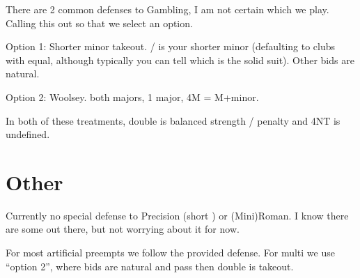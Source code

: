\documentclass[tom-ari]{subfile}
\begin{document}
	There are 2 common defenses to Gambling, I am not certain which we play. Calling this out so that we select an option.
	
	Option 1:  Shorter minor takeout. / is your shorter minor (defaulting to clubs with equal, although typically you can tell which is the solid suit). Other bids are natural.
	
	Option 2:  Woolsey.  both majors,  1 major, 4M = M+minor.
	
	In both of these treatments, double is balanced strength / penalty and 4NT is undefined.
	
	\section{Other}
	
	Currently no special defense to  Precision (short \diamondsuit) or (Mini)Roman. I know there are some out there, but not worrying about it for now.
	
	For most artificial preempts we follow the provided defense. For multi we use ``option 2'', where bids are natural and pass then double is takeout.
	
\end{document}
